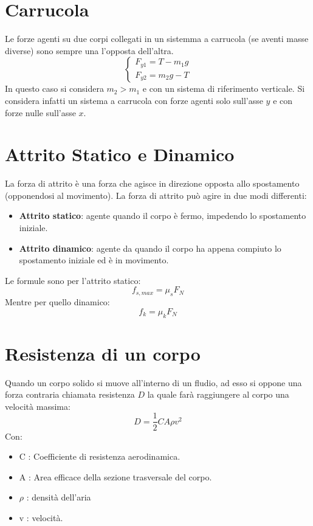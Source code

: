     \section{Carrucola} Le forze agenti su due corpi collegati in un sistemma a
    carrucola (se aventi masse diverse) sono sempre una l'opposta dell'altra.
        \begin{equation}
            \begin{cases}
                F_{y1} = T - m_1g \\
                F_{y2} = m_2g - T
            \end{cases}
        \end{equation}
    In questo caso si considera $m_2 > m_1$ e con un sistema di riferimento 
    verticale. Si considera infatti un sistema a carrucola con forze agenti solo
    sull'asse $y$ e con forze nulle sull'asse $x$.

    \section{Attrito Statico e Dinamico} La forza di attrito è una forza che 
    agisce in direzione opposta allo spostamento (opponendosi al movimento). La 
    forza di attrito può agire in due modi differenti:
        \begin{itemize}
            \item \textbf{Attrito statico}: agente quando il corpo è fermo, 
            impedendo lo spostamento iniziale.
            \item \textbf{Attrito dinamico}: agente da quando il corpo ha appena 
            compiuto lo spostamento iniziale ed è in movimento.
        \end{itemize}
    Le formule sono per l'attrito statico:
        \begin{equation}
            f_{s, max} = \mu_sF_N
        \end{equation}
        Mentre per quello dinamico:
        \begin{equation}
            f_{k} = \mu_kF_N
        \end{equation}
    
    \section{Resistenza di un corpo} Quando un corpo solido si muove 
    all'interno di un fludio, ad esso si oppone una forza contraria chiamata
    resistenza $D$ la quale farà raggiungere al corpo una velocità massima:
        \begin{equation}
            D = \frac{1}{2}CA\rho v^2
        \end{equation}
        Con:
        \begin{itemize}
            \item C : Coefficiente di resistenza aerodinamica.
            \item A : Area efficace della sezione trasversale del corpo.
            \item $\rho$ : densità dell'aria
            \item v : velocità.
        \end{itemize}

